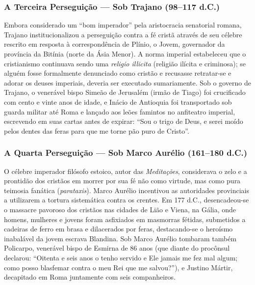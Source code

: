 \subsubsection*{A Terceira Perseguição — Sob Trajano (98–117 d.C.)}
Embora considerado um ``bom imperador'' pela aristocracia senatorial romana, Trajano institucionalizou a perseguição contra a fé cristã através de seu célebre rescrito em resposta à correspondência de Plínio, o Jovem, governador da província da Bitínia (norte da Ásia Menor). A norma imperial estabeleceu que o cristianismo continuava sendo uma \textit{religio illicita} (religião ilícita e criminosa); se alguém fosse formalmente denunciado como cristão e recusasse retratar-se e adorar os deuses imperiais, deveria ser executado sumariamente. Sob o governo de Trajano, o venerável bispo Simeão de Jerusalém (irmão de Tiago) foi crucificado com cento e vinte anos de idade, e Inácio de Antioquia foi transportado sob guarda militar até Roma e lançado aos leões famintos no anfiteatro imperial, escrevendo em suas cartas antes de expirar: ``Sou o trigo de Deus, e serei moído pelos dentes das feras para que me torne pão puro de Cristo''.


\subsubsection*{A Quarta Perseguição — Sob Marco Aurélio (161–180 d.C.)}
O célebre imperador filósofo estoico, autor das \textit{Meditações}, considerava o zelo e a prontidão dos cristãos em morrer por sua fé não como virtude, mas como pura teimosia fanática (\textit{parataxis}). Marco Aurélio incentivou as autoridades provinciais a utilizarem a tortura sistemática contra os crentes. Em 177 d.C., desencadeou-se o massacre pavoroso dos cristãos nas cidades de Lião e Viena, na Gália, onde homens, mulheres e jovens foram asfixiados em masmorras fétidas, submetidos a cadeiras de ferro em brasa e dilacerados por feras, destacando-se o heroísmo inabalável da jovem escrava Blandina. Sob Marco Aurélio tombaram também Policarpo, venerável bispo de Esmirna de 86 anos (que diante do procônsul declarou: ``Oitenta e seis anos o tenho servido e Ele jamais me fez mal algum; como posso blasfemar contra o meu Rei que me salvou?''), e Justino Mártir, decapitado em Roma juntamente com seis companheiros.



